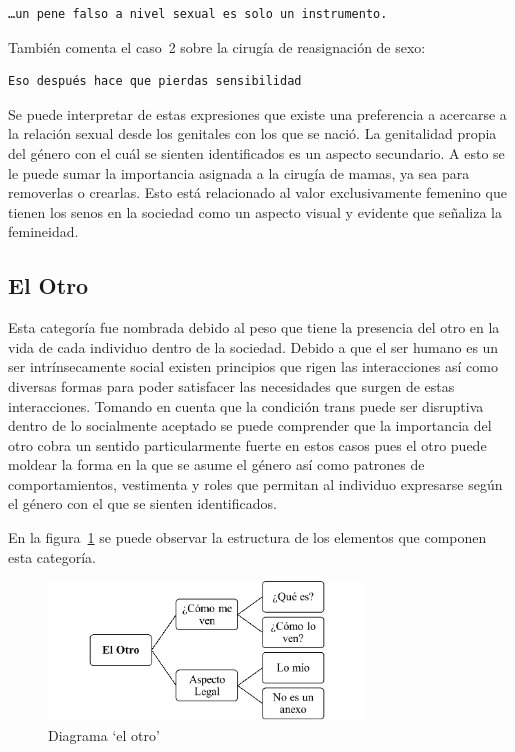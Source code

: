  \begin{verbatim}
…un pene falso a nivel sexual es solo un instrumento.
 \end{verbatim}

También comenta el caso~2 sobre la cirugía de reasignación de sexo:

\begin{verbatim}
Eso después hace que pierdas sensibilidad
\end{verbatim}

Se puede interpretar de estas expresiones que existe una preferencia a acercarse
a la relación sexual desde los genitales con los que se nació. La genitalidad
propia del género con el cuál se sienten identificados es un aspecto secundario.
A esto se le puede sumar la importancia asignada a la cirugía de mamas, ya sea
para removerlas o crearlas. Esto está relacionado al valor exclusivamente
femenino que tienen los senos en la sociedad como un aspecto visual y evidente
que señaliza la femineidad.

\subsection{El Otro}

Esta categoría fue nombrada debido al peso que tiene la presencia del otro en
la vida de cada individuo dentro de la sociedad. Debido a que el ser humano es
un ser intrínsecamente social existen principios que rigen las interacciones así
como diversas formas para poder satisfacer las necesidades que surgen de estas
interacciones. Tomando en cuenta que la condición trans puede ser disruptiva
dentro de lo socialmente aceptado se puede comprender que la importancia del
otro cobra un sentido particularmente fuerte en estos casos pues el otro puede
moldear la forma en la que se asume el género así como patrones de
comportamientos, vestimenta y roles que permitan al individuo expresarse según
el género con el que se sienten identificados.

En la figura~\ref{fig:otro} se puede observar la estructura de los elementos que
componen esta categoría.

\begin{figure}
    \centering
    \includegraphics[width=0.75\textwidth]{otro}
    \caption{Diagrama ‘el otro’}\label{fig:otro}
\end{figure}

